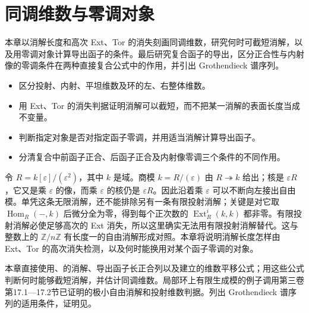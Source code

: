 
\chapter{同调维数与零调对象}
\label{b4:ch:10}

\begin{chapterabstract}
	本章以消解长度和高次 Ext、Tor 的消失刻画同调维数，研究何时可截短消解，以及用零调对象计算导出函子的条件。最后研究复合函子的导出，区分正合性与内射像的零调条件在两种直接复合公式中的作用，并引出 Grothendieck 谱序列。
\end{chapterabstract}

\begin{learninggoals}
	\begin{itemize}
		\item 区分投射、内射、平坦维数及环的左、右整体维数。
		\item 用 Ext、Tor 的消失判据证明消解可以截短，而不把某一消解的表面长度当成不变量。
		\item 判断指定对象是否对指定函子零调，并用适当消解计算导出函子。
		\item 分清复合中前函子正合、后函子正合及内射像零调三个条件的不同作用。
	\end{itemize}
\end{learninggoals}

令 \(R=k[\varepsilon]/(\varepsilon^2)\)，其中 \(k\) 是域。商模 \(k=R/(\varepsilon)\) 由 \(R\twoheadrightarrow k\) 给出；核是 \(\varepsilon R\)，它又是乘 \(\varepsilon\) 的像，而乘 \(\varepsilon\) 的核仍是 \(\varepsilon R\)。因此沿着乘 \(\varepsilon\) 可以不断向左接出自由模。单凭这条无限消解，还不能排除另有一条有限投射消解；关键是对它取 \(\operatorname{Hom}_R(-,k)\) 后微分全为零，得到每个正次数的 \(\operatorname{Ext}_R^i(k,k)\) 都非零。有限投射消解必使足够高次的 Ext 消失，所以这里确实无法用有限投射消解替代。这与整数上的 \(\mathbb Z/n\mathbb Z\) 有长度一的自由消解形成对照。本章将说明消解长度怎样由 Ext、Tor 的高次消失检测，以及何时能换用对某个函子零调的对象。

\ProseParagraphBreak
本章直接使用、的消解、导出函子长正合列以及建立的维数平移公式；用这些公式判断何时能够截短消解，并估计同调维数。局部环上有限生成模的例子调用第三卷第17.1—17.2节已证明的极小自由消解和投射维数判据。列出 Grothendieck 谱序列的适用条件，证明见。

